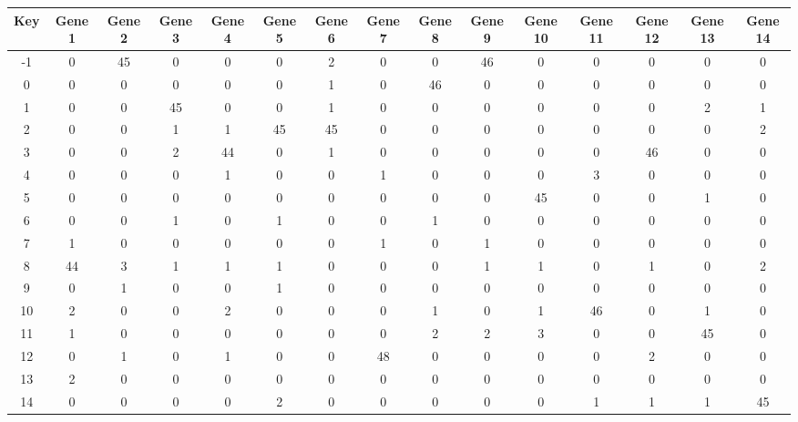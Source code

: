 \begin{tabular}{|c|c|c|c|c|c|c|c|c|c|c|c|c|c|c|}
\hline
Key & Gene 1 & Gene 2 & Gene 3 & Gene 4 & Gene 5 & Gene 6 & Gene 7 & Gene 8 & Gene 9 & Gene 10 & Gene 11 & Gene 12 & Gene 13 & Gene 14 \\
\hline
-1 & 0 & 45 & 0 & 0 & 0 & 2 & 0 & 0 & 46 & 0 & 0 & 0 & 0 & 0 \\
0 & 0 & 0 & 0 & 0 & 0 & 1 & 0 & 46 & 0 & 0 & 0 & 0 & 0 & 0 \\
1 & 0 & 0 & 45 & 0 & 0 & 1 & 0 & 0 & 0 & 0 & 0 & 0 & 2 & 1 \\
2 & 0 & 0 & 1 & 1 & 45 & 45 & 0 & 0 & 0 & 0 & 0 & 0 & 0 & 2 \\
3 & 0 & 0 & 2 & 44 & 0 & 1 & 0 & 0 & 0 & 0 & 0 & 46 & 0 & 0 \\
4 & 0 & 0 & 0 & 1 & 0 & 0 & 1 & 0 & 0 & 0 & 3 & 0 & 0 & 0 \\
5 & 0 & 0 & 0 & 0 & 0 & 0 & 0 & 0 & 0 & 45 & 0 & 0 & 1 & 0 \\
6 & 0 & 0 & 1 & 0 & 1 & 0 & 0 & 1 & 0 & 0 & 0 & 0 & 0 & 0 \\
7 & 1 & 0 & 0 & 0 & 0 & 0 & 1 & 0 & 1 & 0 & 0 & 0 & 0 & 0 \\
8 & 44 & 3 & 1 & 1 & 1 & 0 & 0 & 0 & 1 & 1 & 0 & 1 & 0 & 2 \\
9 & 0 & 1 & 0 & 0 & 1 & 0 & 0 & 0 & 0 & 0 & 0 & 0 & 0 & 0 \\
10 & 2 & 0 & 0 & 2 & 0 & 0 & 0 & 1 & 0 & 1 & 46 & 0 & 1 & 0 \\
11 & 1 & 0 & 0 & 0 & 0 & 0 & 0 & 2 & 2 & 3 & 0 & 0 & 45 & 0 \\
12 & 0 & 1 & 0 & 1 & 0 & 0 & 48 & 0 & 0 & 0 & 0 & 2 & 0 & 0 \\
13 & 2 & 0 & 0 & 0 & 0 & 0 & 0 & 0 & 0 & 0 & 0 & 0 & 0 & 0 \\
14 & 0 & 0 & 0 & 0 & 2 & 0 & 0 & 0 & 0 & 0 & 1 & 1 & 1 & 45 \\
\hline
\end{tabular}